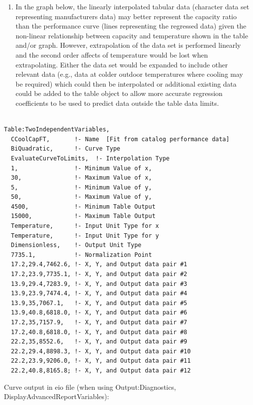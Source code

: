 \begin{enumerate}
\item In the graph below, the linearly interpolated tabular data (character data set representing manufacturers data) may better represent the capacity ratio than the performance curve (lines representing the regressed data) given the non-linear relationship between capacity and temperature shown in the table and/or graph. However, extrapolation of the data set is performed linearly and the second order affects of temperature would be lost when extrapolating. Either the data set would be expanded to include other relevant data (e.g., data at colder outdoor temperatures where cooling may be required) which could then be interpolated or additional existing data could be added to the table object to allow more accurate regression coefficients to be used to predict data outside the table data limits.
\end{enumerate}

\begin{lstlisting}

Table:TwoIndependentVariables,
  CCoolCapFT,       !- Name  [Fit from catalog performance data]
  BiQuadratic,      !- Curve Type
  EvaluateCurveToLimits,  !- Interpolation Type
  1,                !- Minimum Value of x,
  30,               !- Maximum Value of x,
  5,                !- Minimum Value of y,
  50,               !- Maximum Value of y,
  4500,             !- Minimum Table Output
  15000,            !- Maximum Table Output
  Temperature,      !- Input Unit Type for x
  Temperature,      !- Input Unit Type for y
  Dimensionless,    !- Output Unit Type
  7735.1,           !- Normalization Point
  17.2,29.4,7462.6, !- X, Y, and Output data pair #1
  17.2,23.9,7735.1, !- X, Y, and Output data pair #2
  13.9,29.4,7283.9, !- X, Y, and Output data pair #3
  13.9,23.9,7474.4, !- X, Y, and Output data pair #4
  13.9,35,7067.1,   !- X, Y, and Output data pair #5
  13.9,40.8,6818.0, !- X, Y, and Output data pair #6
  17.2,35,7157.9,   !- X, Y, and Output data pair #7
  17.2,40.8,6818.0, !- X, Y, and Output data pair #8
  22.2,35,8552.6,   !- X, Y, and Output data pair #9
  22.2,29.4,8898.3, !- X, Y, and Output data pair #10
  22.2,23.9,9206.0, !- X, Y, and Output data pair #11
  22.2,40.8,8165.8; !- X, Y, and Output data pair #12
\end{lstlisting}

Curve output in eio file (when using Output:Diagnostics, DisplayAdvancedReportVariables):


